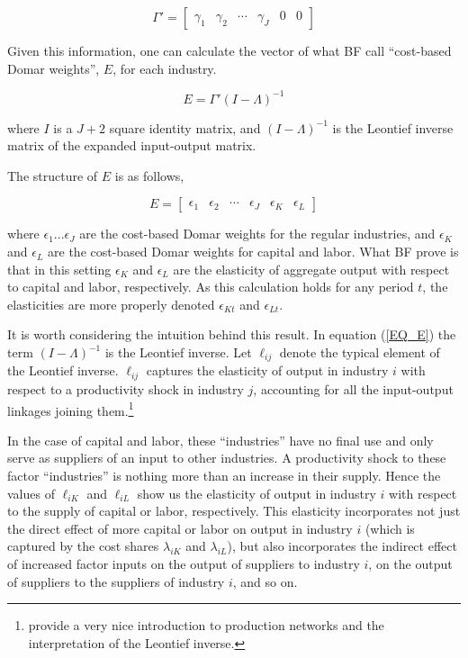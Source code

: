 \documentclass[11pt]{article}
\begin{document}
\begin{equation}
	\Gamma' = 
	\begin{bmatrix}
		\gamma_1 &
		\gamma_2 &
		\cdots &
		\gamma_J &
		0 &
		0
	\end{bmatrix} \label{EQ_Gamma}
\end{equation}

Given this information, one can calculate the vector of what BF call ``cost-based Domar weights'', $E$, for each industry. 

\begin{equation}
	E = \Gamma' (I - \Lambda)^{-1} \label{EQ_E}
\end{equation}

where $I$ is a $J+2$ square identity matrix, and $(I - \Lambda)^{-1}$ is the Leontief inverse matrix of the expanded input-output matrix. 

The structure of $E$ is as follows,

\begin{equation}
	E = 
	\begin{bmatrix}
		\epsilon_1 &
		\epsilon_2 &
		\cdots &
		\epsilon_J &
		\epsilon_K &
		\epsilon_L
	\end{bmatrix}
\end{equation}

where $\epsilon_1 ... \epsilon_J$ are the cost-based Domar weights for the regular industries, and $\epsilon_K$ and $\epsilon_L$ are the cost-based Domar weights for capital and labor. What BF prove is that in this setting $\epsilon_K$ and $\epsilon_L$ are the elasticity of aggregate output with respect to capital and labor, respectively. As this calculation holds for any period $t$, the elasticities are more properly denoted $\epsilon_{Kt}$ and $\epsilon_{Lt}$.

It is worth considering the intuition behind this result. In equation (\ref{EQ_E}) the term $(I - \Lambda)^{-1}$ is the Leontief inverse. Let $\ell_{ij}$ denote the typical element of the Leontief inverse. $\ell_{ij}$ captures the elasticity of output in industry $i$ with respect to a productivity shock in industry $j$, accounting for all the input-output linkages joining them.\footnote{\cite{cts2018} provide a very nice introduction to production networks and the interpretation of the Leontief inverse.}

In the case of capital and labor, these ``industries'' have no final use and only serve as suppliers of an input to other industries. A productivity shock to these factor ``industries'' is nothing more than an increase in their supply. Hence the values of $\ell_{iK}$ and $\ell_{iL}$ show us the elasticity of output in industry $i$ with respect to the supply of capital or labor, respectively. This elasticity incorporates not just the direct effect of more capital or labor on output in industry $i$ (which is captured by the cost shares $\lambda_{iK}$ and $\lambda_{iL}$), but also incorporates the indirect effect of increased factor inputs on the output of suppliers to industry $i$, on the output of suppliers to the suppliers of industry $i$, and so on. 
\end{document}
